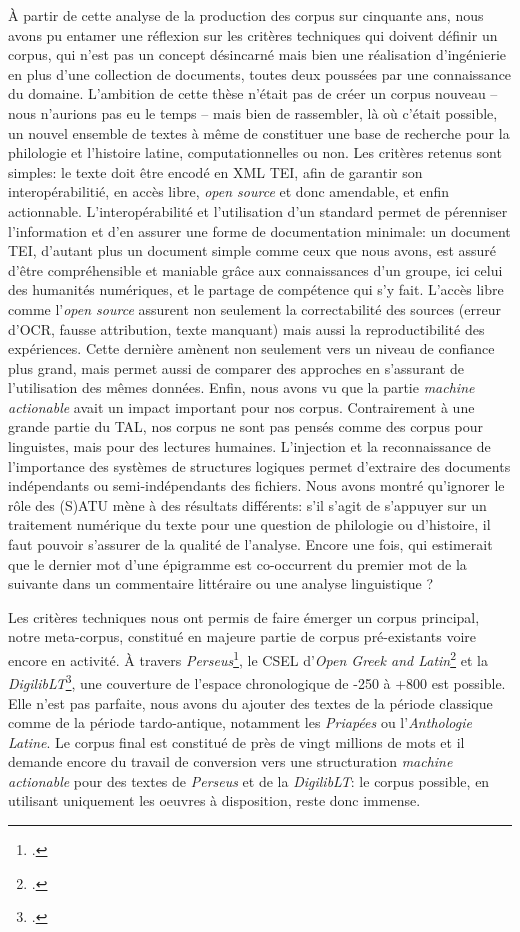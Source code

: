 À partir de cette analyse de la production des corpus sur cinquante ans, nous avons pu entamer une réflexion sur les critères techniques qui doivent définir un corpus, qui n'est pas un concept désincarné mais bien une réalisation d'ingénierie en plus d'une collection de documents, toutes deux poussées par une connaissance du domaine. L'ambition de cette thèse n'était pas de créer un corpus nouveau -- nous n'aurions pas eu le temps -- mais bien de rassembler, là où c'était possible, un nouvel ensemble de textes à même de constituer une base de recherche pour la philologie et l'histoire latine, computationnelles ou non. Les critères retenus sont simples: le texte doit être encodé en XML TEI, afin de garantir son interopérabilitié, en accès libre, \textit{open source} et donc amendable, et enfin actionnable. L'interopérabilité et l'utilisation d'un standard permet de pérenniser l'information et d'en assurer une forme de documentation minimale: un document TEI, d'autant plus un document simple comme ceux que nous avons, est assuré d'être compréhensible et maniable grâce aux connaissances d'un groupe, ici celui des humanités numériques, et le partage de compétence qui s'y fait. L'accès libre comme l'\textit{open source} assurent non seulement la correctabilité des sources (erreur d'OCR, fausse attribution, texte manquant) mais aussi la reproductibilité des expériences. Cette dernière amènent non seulement vers un niveau de confiance plus grand, mais permet aussi de comparer des approches en s'assurant de l'utilisation des mêmes données. Enfin, nous avons vu que la partie \textit{machine actionable} avait un impact important pour nos corpus. Contrairement à une grande partie du TAL, nos corpus ne sont pas pensés comme des corpus pour linguistes, mais pour des lectures humaines. L'injection et la reconnaissance de l'importance des systèmes de structures logiques permet d'extraire des documents indépendants ou semi-indépendants des fichiers. Nous avons montré qu'ignorer le rôle des (S)ATU mène à des résultats différents: s'il s'agit de s'appuyer sur un traitement numérique du texte pour une question de philologie ou d'histoire, il faut pouvoir s'assurer de la qualité de l'analyse. Encore une fois, qui estimerait que le dernier mot d'une épigramme est co-occurrent du premier mot de la suivante dans un commentaire littéraire ou une analyse linguistique ?

Les critères techniques nous ont permis de faire émerger un corpus principal, notre meta-corpus, constitué en majeure partie de corpus pré-existants voire encore en activité. À travers \textit{Perseus}\footcite{perseus_latinLit}, le CSEL d'\textit{Open Greek and Latin}\footcite{csel_latinlit} et la \textit{DigilibLT}\footcite{digiliblt}, une couverture de l'espace chronologique de -250 à +800 est possible. Elle n'est pas parfaite, nous avons du ajouter des textes de la période classique comme de la période tardo-antique, notamment les \textit{Priapées} ou l'\textit{Anthologie Latine}. Le corpus final est constitué de près de vingt millions de mots et il demande encore du travail de conversion vers une structuration \textit{machine actionable} pour des textes de \textit{Perseus} et de la \textit{DigilibLT}: le corpus possible, en utilisant uniquement les oeuvres à disposition, reste donc immense.

